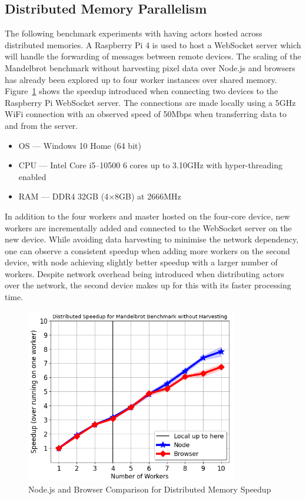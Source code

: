 \documentclass[oneside]{um-fict}
\begin{document}
\subsection{Distributed Memory Parallelism}
The following benchmark experiments with having actors hosted across distributed memories. A Raspberry Pi 4 is used to host a WebSocket server which will handle the forwarding of messages between remote devices. The scaling of the Mandelbrot benchmark without harvesting pixel data over Node.js and browsers has already been explored up to four worker instances over shared memory. Figure~\ref{fig:distributed_memory_speedup} shows the speedup introduced when connecting two devices to the Raspberry Pi WebSocket server. The connections are made locally using a 5GHz WiFi connection with an observed speed of 50Mbps when transferring data to and from the server.
\begin{itemize}
    \item OS --- Windows 10 Home (64 bit)
    \item CPU --- Intel Core i5--10500 6 cores up to 3.10GHz with hyper-threading enabled
    \item RAM --- DDR4 32GB (4$\times$8GB) at 2666MHz
\end{itemize}
In addition to the four workers and master hosted on the four-core device, new workers are incrementally added and connected to the WebSocket server on the new device. While avoiding data harvesting to minimise the network dependency, one can observe a consistent speedup when adding more workers on the second device, with node achieving slightly better speedup with a larger number of workers. Despite network overhead being introduced when distributing actors over the network, the second device makes up for this with its faster processing time.
\begin{figure}[H]
    \begin{centering}
        \includegraphics[width=350px]{resources/distributed_memory_speedup.png}
        \caption{Node.js and Browser Comparison for Distributed Memory Speedup}\label{fig:distributed_memory_speedup}
    \end{centering}
\end{figure}
\end{document}
